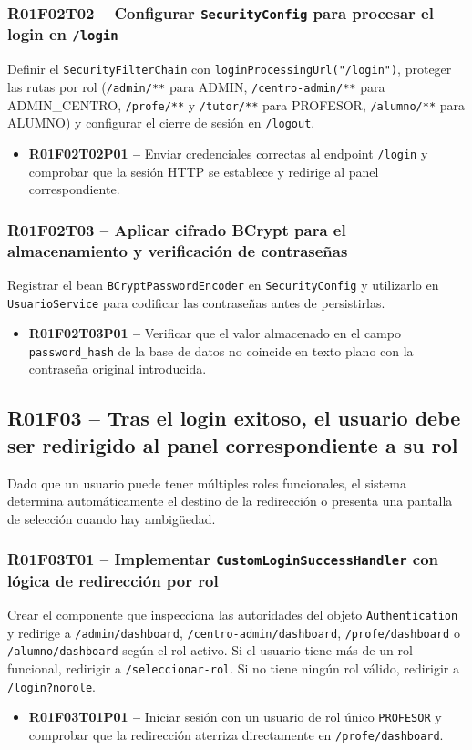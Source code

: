 \documentclass[12pt, a4paper]{report}
\begin{document}
\subsubsection{R01F02T02 -- Configurar \texttt{SecurityConfig} para procesar el login en \texttt{/login}}
Definir el \texttt{SecurityFilterChain} con \texttt{loginProcessingUrl("/login")}, proteger las rutas por rol (\texttt{/admin/**} para ADMIN, \texttt{/centro-admin/**} para ADMIN\_CENTRO, \texttt{/profe/**} y \texttt{/tutor/**} para PROFESOR, \texttt{/alumno/**} para ALUMNO) y configurar el cierre de sesión en \texttt{/logout}.
\begin{itemize}
  \item \textbf{R01F02T02P01 --} Enviar credenciales correctas al endpoint \texttt{/login} y comprobar que la sesión HTTP se establece y redirige al panel correspondiente.
\end{itemize}

\subsubsection{R01F02T03 -- Aplicar cifrado BCrypt para el almacenamiento y verificación de contraseñas}
Registrar el bean \texttt{BCryptPasswordEncoder} en \texttt{SecurityConfig} y utilizarlo en \texttt{UsuarioService} para codificar las contraseñas antes de persistirlas.
\begin{itemize}
  \item \textbf{R01F02T03P01 --} Verificar que el valor almacenado en el campo \texttt{password\_hash} de la base de datos no coincide en texto plano con la contraseña original introducida.
\end{itemize}

\subsection{R01F03 -- Tras el login exitoso, el usuario debe ser redirigido al panel correspondiente a su rol}

Dado que un usuario puede tener múltiples roles funcionales, el sistema determina automáticamente el destino de la redirección o presenta una pantalla de selección cuando hay ambigüedad.

\subsubsection{R01F03T01 -- Implementar \texttt{CustomLoginSuccessHandler} con lógica de redirección por rol}
Crear el componente que inspecciona las autoridades del objeto \texttt{Authentication} y redirige a \texttt{/admin/dashboard}, \texttt{/centro-admin/dashboard}, \texttt{/profe/dashboard} o \texttt{/alumno/dashboard} según el rol activo. Si el usuario tiene más de un rol funcional, redirigir a \texttt{/seleccionar-rol}. Si no tiene ningún rol válido, redirigir a \texttt{/login?norole}.
\begin{itemize}
  \item \textbf{R01F03T01P01 --} Iniciar sesión con un usuario de rol único \texttt{PROFESOR} y comprobar que la redirección aterriza directamente en \texttt{/profe/dashboard}.
\end{itemize}
\end{document}
